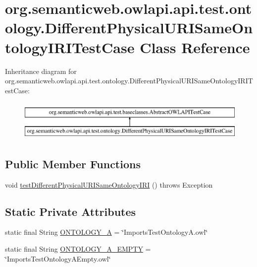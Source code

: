 \hypertarget{classorg_1_1semanticweb_1_1owlapi_1_1api_1_1test_1_1ontology_1_1_different_physical_u_r_i_same_ontology_i_r_i_test_case}{\section{org.\-semanticweb.\-owlapi.\-api.\-test.\-ontology.\-Different\-Physical\-U\-R\-I\-Same\-Ontology\-I\-R\-I\-Test\-Case Class Reference}
\label{classorg_1_1semanticweb_1_1owlapi_1_1api_1_1test_1_1ontology_1_1_different_physical_u_r_i_same_ontology_i_r_i_test_case}
}
Inheritance diagram for org.\-semanticweb.\-owlapi.\-api.\-test.\-ontology.\-Different\-Physical\-U\-R\-I\-Same\-Ontology\-I\-R\-I\-Test\-Case\-:\begin{figure}[H]
\begin{center}
\leavevmode
\includegraphics[height=2.000000cm]{classorg_1_1semanticweb_1_1owlapi_1_1api_1_1test_1_1ontology_1_1_different_physical_u_r_i_same_ontology_i_r_i_test_case}
\end{center}
\end{figure}
\subsection*{Public Member Functions}
\begin{DoxyCompactItemize}
\item 
void \hyperlink{classorg_1_1semanticweb_1_1owlapi_1_1api_1_1test_1_1ontology_1_1_different_physical_u_r_i_same_ontology_i_r_i_test_case_af065b452ea99dc9bd0d83636193d866e}{test\-Different\-Physical\-U\-R\-I\-Same\-Ontology\-I\-R\-I} ()  throws Exception 
\end{DoxyCompactItemize}
\subsection*{Static Private Attributes}
\begin{DoxyCompactItemize}
\item 
static final String \hyperlink{classorg_1_1semanticweb_1_1owlapi_1_1api_1_1test_1_1ontology_1_1_different_physical_u_r_i_same_ontology_i_r_i_test_case_a17cf398390fe9a4899b249685e7a8380}{O\-N\-T\-O\-L\-O\-G\-Y\-\_\-\-A} = \char`\"{}Imports\-Test\-Ontology\-A.\-owl\char`\"{}
\item 
static final String \hyperlink{classorg_1_1semanticweb_1_1owlapi_1_1api_1_1test_1_1ontology_1_1_different_physical_u_r_i_same_ontology_i_r_i_test_case_a17758ea9f371210b47ba980cadb0c290}{O\-N\-T\-O\-L\-O\-G\-Y\-\_\-\-A\-\_\-\-E\-M\-P\-T\-Y} = \char`\"{}Imports\-Test\-Ontology\-A\-Empty.\-owl\char`\"{}
\end{DoxyCompactItemize}
